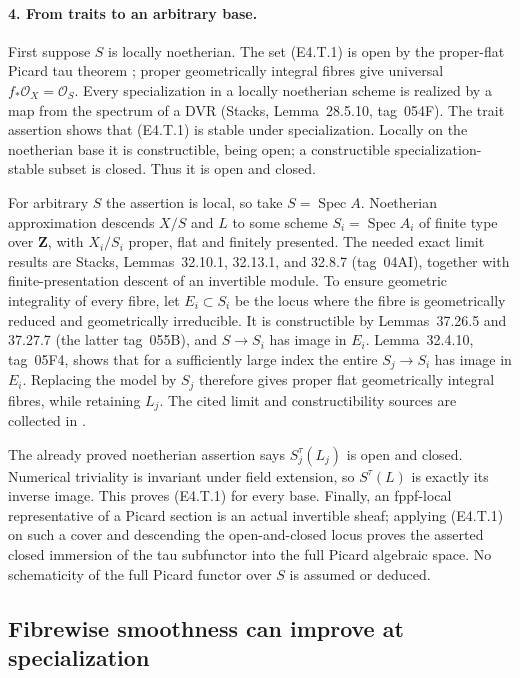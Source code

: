 \paragraph{4. From traits to an arbitrary base.}
First suppose $S$ is locally noetherian. The set (E4.T.1) is open by
the proper-flat Picard tau theorem
\cite[Theorem~2.1]{LaurentSchroer2024}; proper geometrically integral
fibres give universal $f_*\mathcal O_X=\mathcal O_S$.
Every specialization in a locally noetherian scheme is realized by a
map from the spectrum of a DVR (Stacks, Lemma~28.5.10, tag~054F).
The trait assertion shows that (E4.T.1) is stable under specialization.
Locally on the noetherian base it is constructible, being open; a
constructible specialization-stable subset is closed. Thus it is open
and closed.

For arbitrary $S$ the assertion is local, so take $S=\operatorname{Spec}A$.
Noetherian approximation descends $X/S$ and $L$ to some scheme
$S_i=\operatorname{Spec}A_i$ of finite type over $\mathbf Z$, with $X_i/S_i$
proper, flat and finitely presented. The needed exact limit results are
Stacks, Lemmas~32.10.1, 32.13.1, and 32.8.7 (tag~04AI), together with
finite-presentation descent of an invertible module. To ensure geometric
integrality of every fibre, let $E_i\subset S_i$ be the locus where the
fibre is geometrically reduced and geometrically irreducible. It is
constructible by Lemmas~37.26.5 and 37.27.7 (the latter tag~055B), and
$S\to S_i$ has image in $E_i$. Lemma~32.4.10, tag~05F4, shows that for
a sufficiently large index the entire $S_j\to S_i$ has image in $E_i$.
Replacing the model by $S_j$ therefore gives proper flat geometrically
integral fibres, while retaining $L_j$.
The cited limit and constructibility sources are collected in
\cite{BCEStacksTauDescent}.

The already proved noetherian assertion says $S_j^\tau(L_j)$ is open and
closed. Numerical triviality is invariant under field extension, so
$S^\tau(L)$ is exactly its inverse image. This proves (E4.T.1) for every
base. Finally, an fppf-local representative of a Picard section is an
actual invertible sheaf; applying (E4.T.1) on such a cover and descending
the open-and-closed locus proves the asserted closed immersion of the
tau subfunctor into the full Picard algebraic space. No schematicity
of the full Picard functor over $S$ is assumed or deduced.

\subsection{Fibrewise smoothness can improve at specialization}

